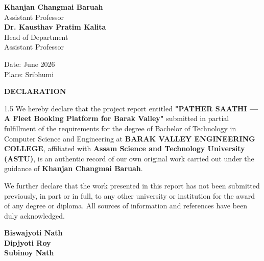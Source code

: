 \vspace{3cm}

\begin{flushright}
    \textbf{Khanjan Changmai Baruah}\\
    \relax Assistant Professor\\
    \vspace{1.5cm}
    \textbf{Dr. Kausthav Pratim Kalita}\\
    Head of Department\\
    \relax Assistant Professor
\end{flushright}

\vspace{1.5cm}
\noindent Date: June 2026\\
Place: Sribhumi

\newpage
\thispagestyle{empty}
\begin{center}
    {\Huge \textbf{DECLARATION}}\par
    \vspace{1.5cm}
\end{center}

\begin{spacing}{1.5}
We hereby declare that the project report entitled \textbf{"PATHER SAATHI --- A Fleet Booking Platform for Barak Valley"} submitted in partial fulfillment of the requirements for the degree of Bachelor of Technology in Computer Science and Engineering at \textbf{BARAK VALLEY ENGINEERING COLLEGE}, affiliated with \textbf{Assam Science and Technology University (ASTU)}, is an authentic record of our own original work carried out under the guidance of \textbf{Khanjan Changmai Baruah}.

We further declare that the work presented in this report has not been submitted previously, in part or in full, to any other university or institution for the award of any degree or diploma. All sources of information and references have been duly acknowledged.
\end{spacing}

\vspace{3cm}

\begin{flushright}
    \textbf{Biswajyoti Nath}\\
    \vspace{1cm}
    \textbf{Dipjyoti Roy}\\
    \vspace{1cm}
    \textbf{Subinoy Nath}
\end{flushright}

